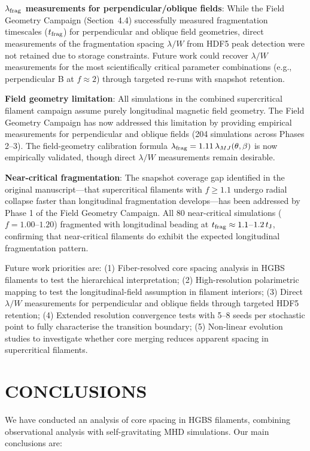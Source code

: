\documentclass[twoside,twocolumn]{mnras}
\begin{document}
\textbf{$\lambda_{\rm frag}$ measurements for perpendicular/oblique fields}: While the Field Geometry Campaign (Section~4.4) successfully measured fragmentation timescales ($t_{\rm frag}$) for perpendicular and oblique field geometries, direct measurements of the fragmentation spacing $\lambda/W$ from HDF5 peak detection were not retained due to storage constraints. Future work could recover $\lambda/W$ measurements for the most scientifically critical parameter combinations (e.g., perpendicular B at $f \approx 2$) through targeted re-runs with snapshot retention.

\textbf{Field geometry limitation}: All simulations in the combined supercritical filament campaign assume purely longitudinal magnetic field geometry. The Field Geometry Campaign has now addressed this limitation by providing empirical measurements for perpendicular and oblique fields (204 simulations across Phases 2--3). The field-geometry calibration formula $\lambda_{\rm frag} = 1.11\,\lambda_{MJ}(\theta, \beta)$ is now empirically validated, though direct $\lambda/W$ measurements remain desirable.

\textbf{Near-critical fragmentation}: The snapshot coverage gap identified in the original manuscript---that supercritical filaments with $f \geq 1.1$ undergo radial collapse faster than longitudinal fragmentation develops---has been addressed by Phase 1 of the Field Geometry Campaign. All 80 near-critical simulations ($f = 1.00$--$1.20$) fragmented with longitudinal beading at $t_{\rm frag} \approx 1.1$--$1.2\,t_{\rm J}$, confirming that near-critical filaments do exhibit the expected longitudinal fragmentation pattern.

Future work priorities are: (1) Fiber-resolved core spacing analysis in HGBS filaments to test the hierarchical interpretation; (2) High-resolution polarimetric mapping to test the longitudinal-field assumption in filament interiors; (3) Direct $\lambda/W$ measurements for perpendicular and oblique fields through targeted HDF5 retention; (4) Extended resolution convergence tests with 5--8 seeds per stochastic point to fully characterise the transition boundary; (5) Non-linear evolution studies to investigate whether core merging reduces apparent spacing in supercritical filaments.

\section{CONCLUSIONS}

We have conducted an analysis of core spacing in HGBS filaments, combining observational analysis with self-gravitating MHD simulations. Our main conclusions are:
\end{document}
